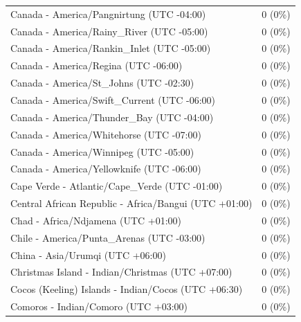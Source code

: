 \begin{appendix}
\begin{table}
{\begin{tabular}[t]{ll}
\hspace{1em}Canada - America/Pangnirtung (UTC -04:00) & 0 (0\%)\\
\addlinespace
\hspace{1em}Canada - America/Rainy\_River (UTC -05:00) & 0 (0\%)\\
\hspace{1em}Canada - America/Rankin\_Inlet (UTC -05:00) & 0 (0\%)\\
\hspace{1em}Canada - America/Regina (UTC -06:00) & 0 (0\%)\\
\hspace{1em}Canada - America/St\_Johns (UTC -02:30) & 0 (0\%)\\
\hspace{1em}Canada - America/Swift\_Current (UTC -06:00) & 0 (0\%)\\
\addlinespace
\hspace{1em}Canada - America/Thunder\_Bay (UTC -04:00) & 0 (0\%)\\
\hspace{1em}Canada - America/Whitehorse (UTC -07:00) & 0 (0\%)\\
\hspace{1em}Canada - America/Winnipeg (UTC -05:00) & 0 (0\%)\\
\hspace{1em}Canada - America/Yellowknife (UTC -06:00) & 0 (0\%)\\
\hspace{1em}Cape Verde - Atlantic/Cape\_Verde (UTC -01:00) & 0 (0\%)\\
\addlinespace
\hspace{1em}Central African Republic - Africa/Bangui (UTC +01:00) & 0 (0\%)\\
\hspace{1em}Chad - Africa/Ndjamena (UTC +01:00) & 0 (0\%)\\
\hspace{1em}Chile - America/Punta\_Arenas (UTC -03:00) & 0 (0\%)\\
\hspace{1em}China - Asia/Urumqi (UTC +06:00) & 0 (0\%)\\
\hspace{1em}Christmas Island - Indian/Christmas (UTC +07:00) & 0 (0\%)\\
\addlinespace
\hspace{1em}Cocos (Keeling) Islands - Indian/Cocos (UTC +06:30) & 0 (0\%)\\
\hspace{1em}Comoros - Indian/Comoro (UTC +03:00) & 0 (0\%)\\

\end{tabular}}
\end{table}
\end{appendix}
